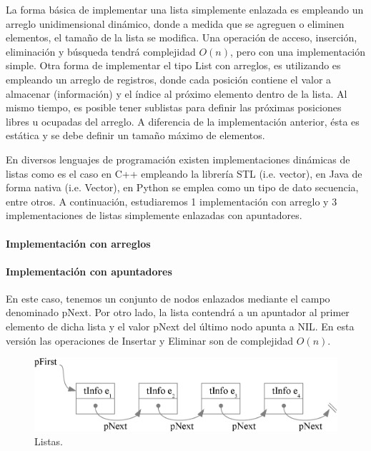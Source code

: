 La forma básica de implementar una lista simplemente enlazada es empleando un arreglo unidimensional dinámico, donde a medida que se agreguen o eliminen elementos, el tamaño de la lista se modifica. Una operación de acceso, inserción, eliminación y búsqueda tendrá complejidad $O(n)$, pero con una implementación simple. Otra forma de implementar el tipo List con arreglos, es utilizando es empleando un arreglo de registros, donde cada posición contiene el valor a almacenar (información) y el índice al próximo elemento dentro de la lista. Al mismo tiempo, es posible tener sublistas para definir las próximas posiciones libres u ocupadas del arreglo. A diferencia de la implementación anterior, ésta es estática y se debe definir un tamaño máximo de elementos.

En diversos lenguajes de programación existen implementaciones dinámicas de listas como es el caso en C++ empleando la librería STL (i.e. vector), en Java de forma nativa (i.e. Vector), en Python se emplea como un tipo de dato secuencia, entre otros. A continuación, estudiaremos 1 implementación con arreglo y 3 implementaciones de listas simplemente enlazadas con apuntadores. 


\paragraph{Implementación con arreglos}

\paragraph{Implementación con apuntadores}

En este caso, tenemos un conjunto de nodos enlazados mediante el campo denominado pNext. Por otro lado, la lista contendrá a un apuntador al primer elemento de dicha lista y el valor pNext del último nodo apunta a NIL. En esta versión las operaciones de Insertar y Eliminar son de complejidad $O(n)$.

\begin{figure}[!htpb]
\centering
\includegraphics[scale=.7]{images/listas.eps}
\caption{Listas.}
\label{fig:listas}
\end{figure}

